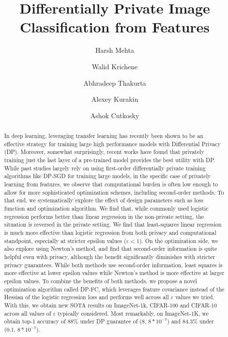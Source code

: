 \documentclass[letterpaper]{article} \usepackage{fullpage}
\title{Differentially Private Image Classification from Features}
\author[1]{Harsh Mehta}
\author[1]{Walid Krichene}
\author[1]{Abhradeep Thakurta}
\author[1]{Alexey Kurakin}
\author[2]{Ashok Cutkosky}
\affil[1]{Google Research \thanks{$harshm|walidk|athakurta|kurakin@google.com$}}
\affil[2]{Boston University \thanks{$ashok@cutkosky.com$}}
\date{}
\renewcommand{\epsilon}{\varepsilon}
\begin{document}
\maketitle

\begin{abstract}
In deep learning, leveraging transfer learning has recently been shown to be an effective strategy for training large high performance models with Differential Privacy (DP). Moreover, somewhat surprisingly, recent works have found that privately training just the last layer of a pre-trained model provides the best utility with DP. While past studies largely rely on using first-order differentially private training algorithms like DP-SGD for training large models, in the specific case of privately learning from features, we observe that computational burden is often low enough to allow for more sophisticated optimization schemes, including second-order methods. To that end, we systematically explore the effect of design parameters such as loss function and optimization algorithm. We find that, while commonly used logistic regression performs better than linear regression in the non-private setting, the situation is reversed in the private setting. We find that least-squares linear regression is much more effective than logistic regression from both privacy and computational standpoint, especially at stricter epsilon values ($\epsilon < 1$). On the optimization side, we also explore using Newton's method, and find that second-order information is quite helpful even with privacy, although the benefit significantly diminishes with stricter privacy guarantees. While both methods use second-order information, least squares is more effective at lower epsilon values while Newton's method is more effective at larger epsilon values. To combine the benefits of both methods, we propose a novel optimization algorithm called DP-FC, which leverages feature covariance instead of the Hessian of the logistic regression loss and performs well across all $\epsilon$ values we tried. With this, we obtain new SOTA results on ImageNet-1k, CIFAR-100 and CIFAR-10 across all values of $\epsilon$ typically considered. Most remarkably, on ImageNet-1K, we obtain top-1 accuracy of 88\% under DP guarantee of (8, $8 * 10^{-7}$) and 84.3\% under (0.1, $8 * 10^{-7}$).
\end{abstract}
\end{document}
